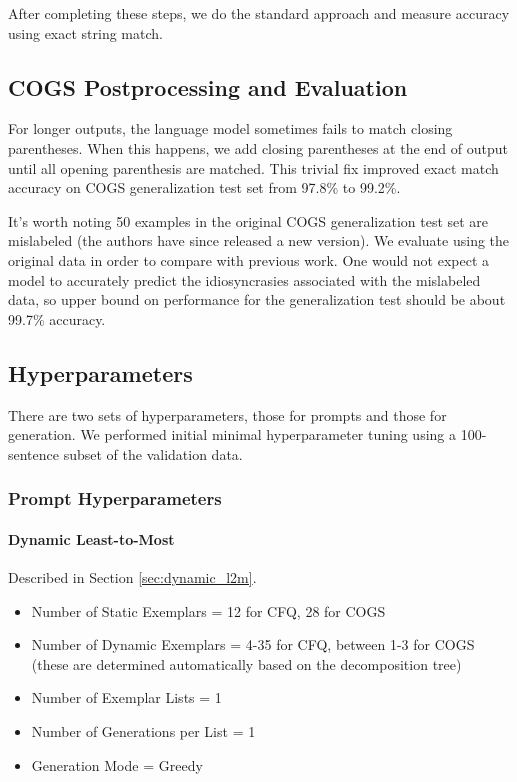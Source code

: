\documentclass{article} \usepackage{iclr2022_conference,times}
\begin{document}
After completing these steps, we do the standard approach and measure accuracy using exact string match. 

\subsection{COGS Postprocessing and Evaluation \label{app:cogs_postprocessing}}
For longer outputs, the language model sometimes fails to match closing parentheses. When this happens, we add closing parentheses at the end of output until all opening parenthesis are matched. This trivial fix improved exact match accuracy on COGS generalization test set from 97.8\% to 99.2\%.

It's worth noting 50 examples in the original COGS generalization test set are mislabeled (the authors have since released a new version). We evaluate using the original data in order to compare with previous work. One would not expect a model to accurately predict the idiosyncrasies associated with the mislabeled data, so upper bound on performance for the generalization test should be about 99.7\% accuracy.

\subsection{Hyperparameters \label{app:hyperparams}}

There are two sets of hyperparameters, those for prompts and those for generation. We performed initial minimal hyperparameter tuning using a 100-sentence subset of the validation data.

\subsubsection{Prompt Hyperparameters}

\paragraph{Dynamic Least-to-Most} Described in Section \ref{sec:dynamic_l2m}.

\begin{itemize}
    \item Number of Static Exemplars = 12 for CFQ, 28 for COGS
    \item Number of Dynamic Exemplars = 4-35 for CFQ, between 1-3 for COGS (these are determined automatically based on the decomposition tree)
    \item Number of Exemplar Lists = 1
    \item Number of Generations per List = 1
    \item Generation Mode = Greedy
\end{itemize}
\end{document}

